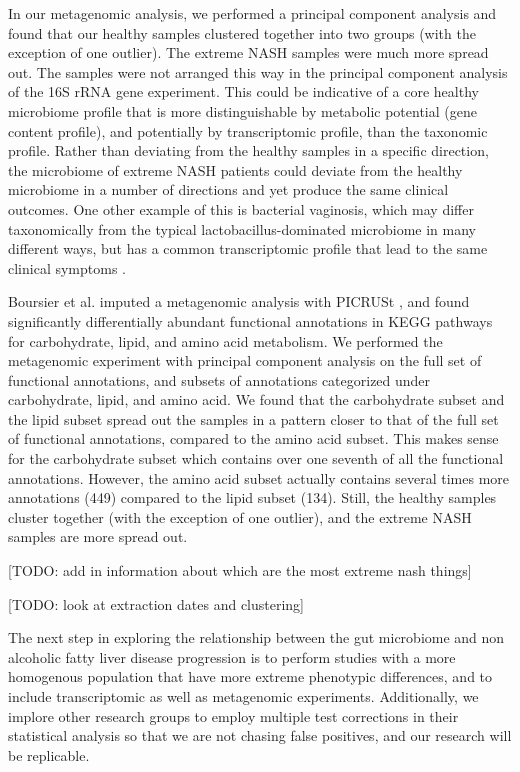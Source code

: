 In our metagenomic analysis, we performed a principal component analysis and found that our healthy samples clustered together into two groups (with the exception of one outlier). The extreme NASH samples were much more spread out. The samples were not arranged this way in the principal component analysis of the 16S rRNA gene experiment. This could be indicative of a core healthy microbiome profile that is more distinguishable by metabolic potential (gene content profile), and potentially by transcriptomic profile, than the taxonomic profile. Rather than deviating from the healthy samples in a specific direction, the microbiome of extreme NASH patients could deviate from the healthy microbiome in a number of directions and yet produce the same clinical outcomes. One other example of this is bacterial vaginosis, which may differ taxonomically from the typical lactobacillus-dominated microbiome in many different ways, but has a common transcriptomic profile that lead to the same clinical symptoms \cite{macklaim2013comparative}.

Boursier et al. \cite{boursier2016severity} imputed a metagenomic analysis with PICRUSt \cite{langille2013predictive}, and found significantly differentially abundant functional annotations in KEGG pathways for carbohydrate, lipid, and amino acid metabolism. We performed the metagenomic experiment with principal component analysis on the full set of functional annotations, and subsets of annotations categorized under carbohydrate, lipid, and amino acid. We found that the carbohydrate subset and the lipid subset spread out the samples in a pattern closer to that of the full set of functional annotations, compared to the amino acid subset. This makes sense for the carbohydrate subset which contains over one seventh of all the functional annotations. However, the amino acid subset actually contains several times more annotations (449) compared to the lipid subset (134). Still, the healthy samples cluster together (with the exception of one outlier), and the extreme NASH samples are more spread out.

[TODO: add in information about which are the most extreme nash things]

[TODO: look at extraction dates and clustering]

The next step in exploring the relationship between the gut microbiome and non alcoholic fatty liver disease progression is to perform studies with a more homogenous population that have more extreme phenotypic differences, and to include transcriptomic as well as metagenomic experiments. Additionally, we implore other research groups to employ multiple test corrections in their statistical analysis so that we are not chasing false positives, and our research will be replicable.

